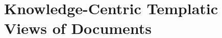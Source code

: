 \chapter{Knowledge-Centric Templatic Views of Documents} \label{chap:chap-3}
























